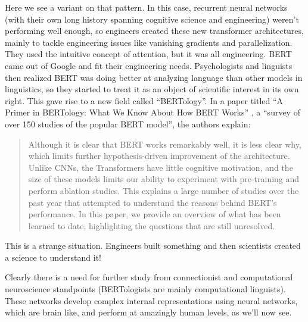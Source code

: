 Here we see a variant on that pattern. In this case, recurrent neural networks (with their own long history spanning cognitive science and engineering) weren't performing well enough, so engineers created these new transformer architectures, mainly to tackle engineering issues like vanishing gradients and parallelization.  They used the intuitive concept of attention, but it was all engineering. BERT came out of Google and fit their engineering needs. Psychologists and linguists then realized  BERT was doing better at analyzing language than other models in linguistics, so they started to treat it as an object of scientific interest in its own right. This gave rise to a new field called ``BERTology''. In a paper titled ``A Primer in BERTology: What We Know About How BERT Works'' \cite{rogers2020primer}, a ``survey of over 150 studies of the popular BERT model'',  the authors explain:
\begin{quote}
Although it is clear that BERT works remarkably well, it is less clear why, which limits further hypothesis-driven improvement of the architecture. Unlike CNNs, the Transformers have little cognitive motivation, and the size of these models limits our ability to experiment with pre-training and perform ablation studies. This explains a large number of studies over the past year that attempted to understand the reasons behind BERT’s performance. In this paper, we provide an overview of what has been learned to date, highlighting the questions that are still unresolved.
\end{quote}
This is a strange situation. Engineers built something and then scientists created a science to understand it!  

Clearly there is a need for further study from connectionist and computational neuroscience standpoints (BERTologists are mainly computational linguists).  These networks develop complex internal representations using neural networks, which are brain like, and perform at amazingly human levels, as we'll now see.


